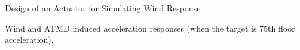 \documentclass[usepdftitle=false]{beamer}
\begin{document}
\begin{frame}{Design of an Actuator for Simulating Wind Response}
\begin{figure}[!ht]
\centering
\setcounter{subfigure}{0}

\label{fig:6-11}
\end{figure}
Wind and ATMD induced acceleration responses (when the target is 75th floor acceleration).
\end{frame}
\end{document}
